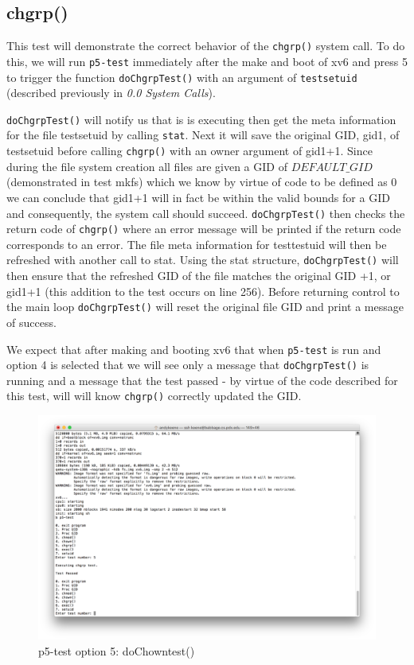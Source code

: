 \documentclass[11pt,letterpaper]{report}
\begin{document}
		
		\subsection{chgrp()}
		This test will demonstrate the correct behavior of the {\tt chgrp()} system call. To do this, we will run {\tt p5-test} immediately after the make and boot of xv6 
	and press 5 to trigger the function {\tt doChgrpTest()} with an argument of {\tt testsetuid} (described previously in \emph{0.0 System Calls}). 
	
	 {\tt doChgrpTest()} will notify us that is is executing then get the meta information for the file testsetuid by calling {\tt stat}. Next it will save the original GID, gid1, of
	 testsetuid before calling {\tt chgrp()} with an owner argument of gid1+1. Since during the file system creation all files are given a GID of $DEFAULT\_GID$ 
	 (demonstrated in test mkfs) which we 
	 know by virtue of code to be defined as 0 we can conclude that gid1+1 will in fact be within the valid bounds for a GID and consequently, the system call should succeed.
	 {\tt doChgrpTest()} then checks the return code of {\tt chgrp()} where an error message will be printed if the return code corresponds to an error. The file meta information
	 for testtestuid will then be refreshed with another call to stat. Using the stat structure, {\tt doChgrpTest()} will then ensure that the refreshed GID of the file matches the original
	 GID +1, or gid1+1 (this addition to the test occurs on line 256). Before returning control to the main loop {\tt doChgrpTest()} will reset the original file GID and print a message of success.
	 
	 We expect that after making and booting xv6 that when {\tt p5-test} is run and option 4 is selected that we will see only a message that {\tt doChgrpTest()} is running and 
	 a message that the test passed - by virtue of the code described for this test, will will know {\tt chgrp()} correctly updated the GID.

\begin{figure}[h!]
\centering
\includegraphics[width=0.8\linewidth]{dochgrptest.png}
\caption{p5-test option 5: doChowntest()}
\label{fig:datetest}
\end{figure}
\end{document}

